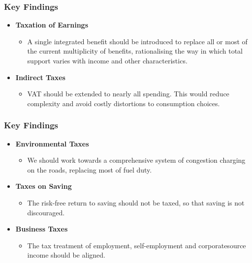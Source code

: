 \begin{frame}
\frametitle{Key Findings}

\begin{itemize}
\item
  \textbf{Taxation of Earnings}

  \begin{itemize}
  \item
    A single integrated benefit should be introduced to replace all or
    most of the current multiplicity of benefits, rationalising the way
    in which total support varies with income and other characteristics.
  \end{itemize}
\item
  \textbf{Indirect Taxes}
  \begin{itemize}
  \item
    VAT should be extended to nearly all spending. This would reduce
    complexity and avoid costly distortions to consumption choices.
  \end{itemize}
\end{itemize}
    
\end{frame}

    
\begin{frame}
\frametitle{Key Findings}

\begin{itemize}
\item
  \textbf{Environmental Taxes}

  \begin{itemize}
  \item
    We should work towards a comprehensive system of congestion charging
    on the roads, replacing most of fuel duty.
  \end{itemize}
\item
  \textbf{Taxes on Saving}

  \begin{itemize}
  \item
    The risk-free return to saving should not be taxed, so that saving
    is not discouraged.
  \end{itemize}
\item
  \textbf{Business Taxes}
  \begin{itemize}
  \item
    The tax treatment of employment, self-employment and corporatesource
    income should be aligned.
  \end{itemize}
\end{itemize}
    
\end{frame}



